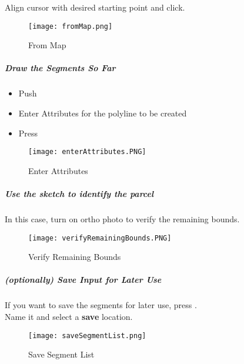   
\noindent Align cursor with desired starting point and click.
\begin{figure}[H]
\centering
    \texttt{[image: fromMap.png]}
\vspace{-.1in}

\caption{From Map}
\end{figure}

\clearpage

\subparagraph*{Draw the Segments So Far}
\vspace{.2in}

\begin{itemize}
\item Push \textbf{}
\item Enter Attributes for the polyline to be created
\item Press \textbf{}
\end{itemize}

\begin{figure}[H]
\centering
    \texttt{[image: enterAttributes.PNG]}
\vspace{-.1in}

\caption{Enter Attributes}
\end{figure}

\clearpage

\subparagraph*{Use the sketch to identify the parcel\\}

In this case, turn on ortho photo to verify the remaining bounds.

\begin{figure}[H]
\centering
    \texttt{[image: verifyRemainingBounds.PNG]}
\vspace{-.1in}

\caption{Verify Remaining Bounds}
\end{figure}

\subparagraph*{(optionally) Save Input for Later Use\\}

If you want to save the segments for later use, press \textbf{}.\\

\noindent Name it and select a \textbf{save} location.

\begin{figure}[H]
\centering
    \texttt{[image: saveSegmentList.png]}
\vspace{-.2in}

\caption{Save Segment List}
\end{figure}

